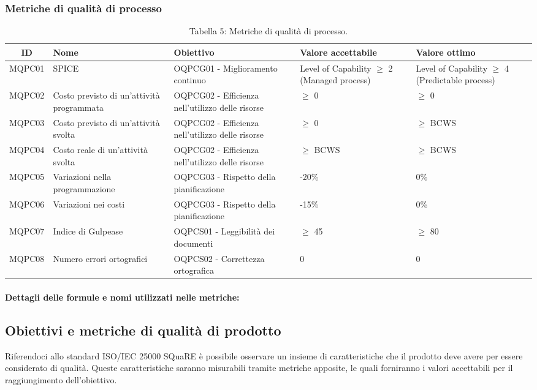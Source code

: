 \subsubsection{Metriche di qualità di processo}
\begin{table}[H]
	\centering
	\begin{tabularx}{\textwidth}{|c|X|X|X|X|}
		\hline
		\textbf{ID} & \textbf{Nome} & \textbf{Obiettivo} & \textbf{Valore accettabile} & \textbf{Valore ottimo}\\
		\hline
		MQPC01 & SPICE & OQPCG01 - Miglioramento continuo & Level of Capability $\geq$ 2 (Managed process) & Level of Capability $\geq$ 4 (Predictable process) \\
		\hline
		MQPC02 & Costo previsto di un'attività programmata & OQPCG02 - Efficienza nell'utilizzo delle risorse & $\geq$ 0 & $\geq$ 0 \\
		\hline
		MQPC03 & Costo previsto di un'attività svolta & OQPCG02 - Efficienza nell'utilizzo delle risorse & $\geq$ 0 & $\geq$ BCWS \\
		\hline
		MQPC04 & Costo reale di un'attività svolta & OQPCG02 - Efficienza nell'utilizzo delle risorse & $\geq$ BCWS & $\geq$ BCWS \\
		\hline
		MQPC05 & Variazioni nella programmazione & OQPCG03 - Rispetto della pianificazione & -20\% & 0\% \\
		\hline
		MQPC06 & Variazioni nei costi & OQPCG03 - Rispetto della pianificazione & -15\% & 0\% \\
		\hline
		MQPC07 & Indice di Gulpease & OQPCS01 - Leggibilità dei documenti & $\geq$ 45 & $\geq$ 80 \\
		\hline
		MQPC08 & Numero errori ortografici & OQPCS02 - Correttezza ortografica & 0 & 0 \\
		\hline
	\end{tabularx}
	\caption{Tabella 5: Metriche di qualità di processo.}
\end{table}

\paragraph {Dettagli delle formule e nomi utilizzati nelle metriche:}

\subsection{Obiettivi e metriche di qualità di prodotto}
Riferendoci allo standard ISO/IEC 25000 SQuaRE è possibile osservare un insieme di caratteristiche che il prodotto deve avere per essere considerato di qualità. Queste caratteristiche saranno misurabili tramite metriche apposite, le quali forniranno i valori accettabili per il raggiungimento dell'obiettivo.
